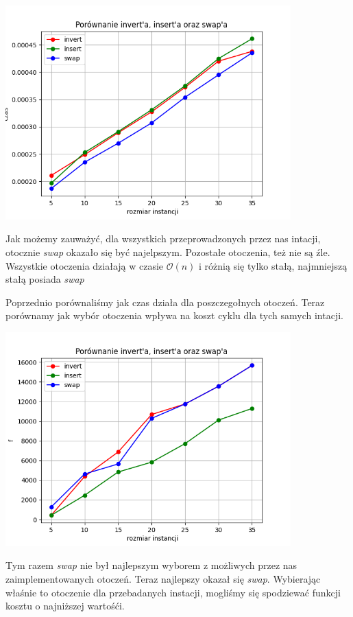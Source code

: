 \documentclass{article}
\begin{document}
    \includegraphics[width=11cm]{./spr2img/Figure_1.png}

    Jak możemy zauważyć, dla wszystkich przeprowadzonych
    przez nas intacji, otocznie \emph{swap} okazało się być
    najelpszym. Pozostałe otoczenia, też nie są źle. Wszystkie
    otoczenia działają w czasie $\mathcal{O}(n)$ i różnią się tylko
    stałą, najmniejszą stałą posiada \emph{swap}

    Poprzednio porównaliśmy jak czas działa dla poszczegołnych otoczeń. Teraz 
    porównamy jak wybór otoczenia wpływa na koszt cyklu dla tych samych 
    intacji.

    \includegraphics[width=11cm]{./spr2img/Figure_5.png}

    Tym razem \emph{swap} nie był najlepszym wyborem z możliwych przez nas
    zaimplementowanych otoczeń. Teraz najlepszy okazał się \emph{swap}. 
    Wybierając właśnie to otoczenie dla przebadanych instacji, mogliśmy się
    spodziewać funkcji kosztu o najniższej wartośći.
\end{document}
